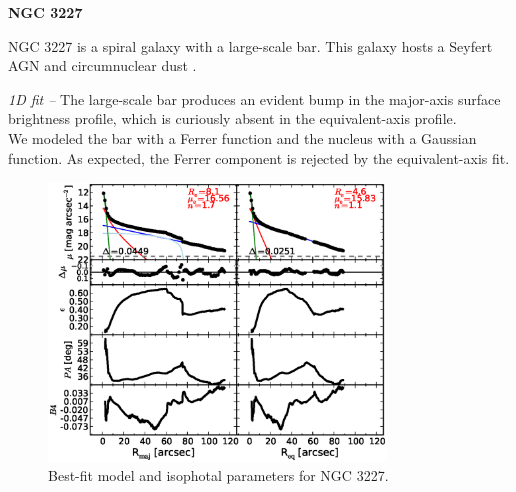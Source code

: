 \documentclass[preprint2]{emulateapj}
\newcommand{\fitfigurewidth}{0.8\textwidth}
\begin{document}
  \clearpage\newpage\noindent
  {\bf NGC 3227 \\}

  NGC 3227 is a spiral galaxy with a large-scale bar. 
  This galaxy hosts a Seyfert AGN \citep{khachikian1974} and circumnuclear dust \citep{martini2003}. 


  \emph{1D fit -- }
  The large-scale bar produces an evident bump in the major-axis surface brightness profile,
  which is curiously absent in the equivalent-axis profile. \\
  We modeled the bar with a Ferrer function and the nucleus with a Gaussian function. 
  As expected, the Ferrer component is rejected by the equivalent-axis fit.

  \begin{figure}[h]
  \begin{center}
  \includegraphics[width=\fitfigurewidth]{images/n3227_1Dfit.eps}
  \caption{Best-fit model and isophotal parameters for NGC 3227.}
  \end{center}
  \end{figure}
\end{document}
